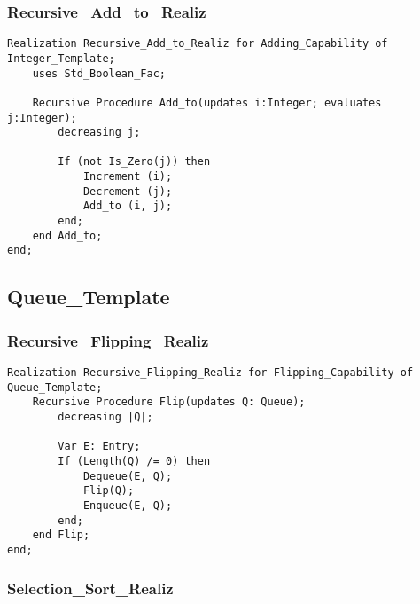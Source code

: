 		\subsubsection{Recursive\_Add\_to\_Realiz}	%

\begin{lstlisting}[language=resolve]
Realization Recursive_Add_to_Realiz for Adding_Capability of Integer_Template;
	uses Std_Boolean_Fac;

	Recursive Procedure Add_to(updates i:Integer; evaluates j:Integer);
		decreasing j;

		If (not Is_Zero(j)) then
			Increment (i);
			Decrement (j);
			Add_to (i, j);
		end;
	end Add_to;
end;
\end{lstlisting}

	\subsection{Queue\_Template}	%

		\subsubsection{Recursive\_Flipping\_Realiz}	%

\begin{lstlisting}[language=resolve]
Realization Recursive_Flipping_Realiz for Flipping_Capability of Queue_Template;
    Recursive Procedure Flip(updates Q: Queue);
        decreasing |Q|;

        Var E: Entry;
        If (Length(Q) /= 0) then
            Dequeue(E, Q);
            Flip(Q);
            Enqueue(E, Q);
        end;
    end Flip;
end;
\end{lstlisting}

		\subsubsection{Selection\_Sort\_Realiz}	%

